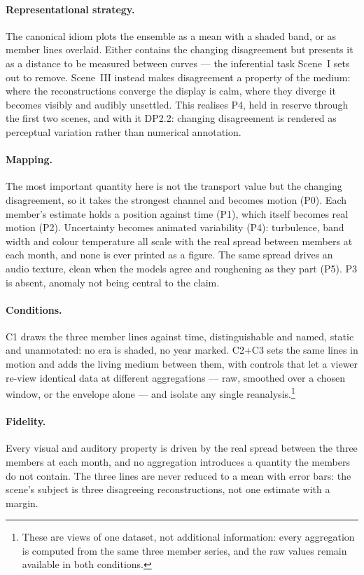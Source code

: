 \paragraph{Representational strategy.} The canonical idiom plots the ensemble as a mean with a shaded band, or as member lines overlaid. Either contains the changing disagreement but presents it as a distance to be measured between curves --- the inferential task Scene~I sets out to remove. Scene~III instead makes disagreement a property of the medium: where the reconstructions converge the display is calm, where they diverge it becomes visibly and audibly unsettled. This realises P4, held in reserve through the first two scenes, and with it DP2.2: changing disagreement is rendered as perceptual variation rather than numerical annotation.

\paragraph{Mapping.} The most important quantity here is not the transport value but the changing disagreement, so it takes the strongest channel and becomes motion (P0). Each member's estimate holds a position against time (P1), which itself becomes real motion (P2). Uncertainty becomes animated variability (P4): turbulence, band width and colour temperature all scale with the real spread between members at each month, and none is ever printed as a figure. The same spread drives an audio texture, clean when the models agree and roughening as they part (P5). P3 is absent, anomaly not being central to the claim.

\paragraph{Conditions.} C1 draws the three member lines against time, distinguishable and named, static and unannotated: no era is shaded, no year marked. C2+C3 sets the same lines in motion and adds the living medium between them, with controls that let a viewer re-view identical data at different aggregations --- raw, smoothed over a chosen window, or the envelope alone --- and isolate any single reanalysis.\footnote{These are views of one dataset, not additional information: every aggregation is computed from the same three member series, and the raw values remain available in both conditions.}

\paragraph{Fidelity.} Every visual and auditory property is driven by the real spread between the three members at each month, and no aggregation introduces a quantity the members do not contain. The three lines are never reduced to a mean with error bars: the scene's subject is three disagreeing reconstructions, not one estimate with a margin.

